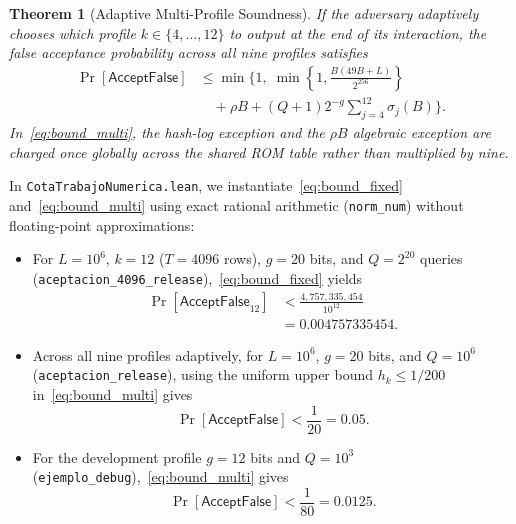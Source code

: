 \documentclass[conference]{IEEEtran}
\newtheorem{theorem}{Theorem}
\theoremstyle{definition}
\begin{document}
\begin{theorem}[Adaptive Multi-Profile Soundness]
\label{thm:multi}
If the adversary adaptively chooses which profile $k \in \{4, \dots, 12\}$ to output at the end of its interaction, the false acceptance probability across all nine profiles satisfies
\begin{equation}
\label{eq:bound_multi}
\begin{aligned}
\Pr[\mathsf{AcceptFalse}] &\le \min\biggl\{1,\;
\min\left\{1, \frac{B(49B + L)}{2^{256}}\right\} \\
&\quad + \rho B + (Q + 1)2^{-g}\sum_{j=4}^{12} \sigma_j(B)\biggr\}.
\end{aligned}
\end{equation}
In~\eqref{eq:bound_multi}, the hash-log exception and the $\rho B$ algebraic exception are charged \emph{once} globally across the shared ROM table rather than multiplied by nine.
\end{theorem}

In \texttt{CotaTrabajoNumerica.lean}, we instantiate~\eqref{eq:bound_fixed} and~\eqref{eq:bound_multi} using exact rational arithmetic (\texttt{norm\_num}) without floating-point approximations:
\begin{itemize}
    \setlength{\itemsep}{2pt}
    \item For $L = 10^6$, $k = 12$ ($T = 4096$ rows), $g = 20$ bits, and $Q = 2^{20}$ queries (\texttt{aceptacion\_4096\_release}),~\eqref{eq:bound_fixed} yields
    \begin{equation}
    \label{eq:num_4096}
    \begin{aligned}
    \Pr[\mathsf{AcceptFalse}_{12}] &< \frac{4{,}757{,}335{,}454}{10^{12}} \\
    &= 0.004757335454.
    \end{aligned}
    \end{equation}
    \item Across all nine profiles adaptively, for $L = 10^6$, $g = 20$ bits, and $Q = 10^6$ (\texttt{aceptacion\_release}), using the uniform upper bound $h_k \le 1/200$ in~\eqref{eq:bound_multi} gives
    \begin{equation}
    \label{eq:num_release}
    \Pr[\mathsf{AcceptFalse}] < \frac{1}{20} = 0.05.
    \end{equation}
    \item For the development profile $g = 12$ bits and $Q = 10^3$ (\texttt{ejemplo\_debug}),~\eqref{eq:bound_multi} gives
    \begin{equation}
    \label{eq:num_debug}
    \Pr[\mathsf{AcceptFalse}] < \frac{1}{80} = 0.0125.
    \end{equation}
\end{itemize}
\end{document}
